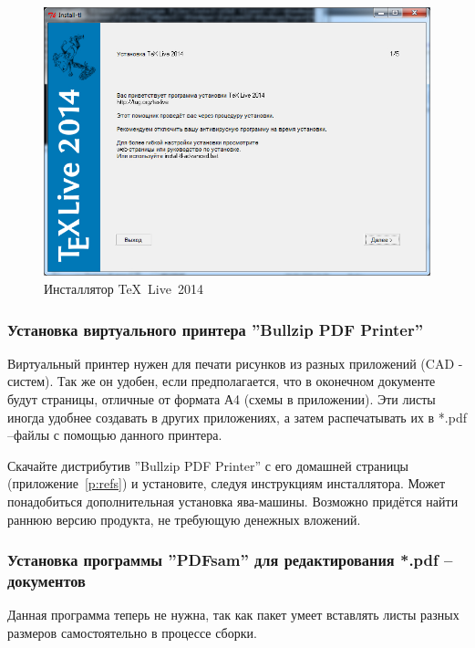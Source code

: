 \begin{figure}[H]\center
  \captionsetup{singlelinecheck=true} %
  \includegraphics*[scale=0.65]{./about/texlive2010}
  \caption{Инсталлятор \TeX~Live~2014} \label{p:texlive2010}
\end{figure}


\subsubsection{Установка виртуального принтера ''Bullzip PDF Printer''}

Виртуальный принтер нужен для печати рисунков из разных приложений (CAD - систем). Так же он удобен, если предполагается, что в оконечном документе будут страницы, отличные от формата А4 (схемы в приложении). Эти листы иногда удобнее создавать в других приложениях, а затем распечатывать их в *.pdf –файлы с помощью данного принтера.

Скачайте дистрибутив ''Bullzip PDF Printer'' с его домашней страницы (приложение~\ref{p:refs}) и установите, следуя инструкциям инсталлятора. Может понадобиться дополнительная установка ява-машины. Возможно придётся найти раннюю версию продукта, не требующую денежных вложений.


\subsubsection{Установка программы ''PDFsam'' для редактирования *.pdf – документов}

Данная программа теперь не нужна, так как пакет умеет вставлять листы разных размеров самостоятельно в процессе сборки.

